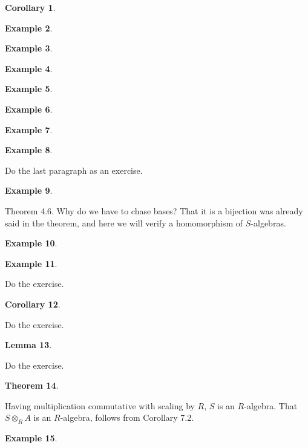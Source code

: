 \documentclass{article}
\newtheorem{theorem}{Theorem}[section]
\newtheorem{corollary}[theorem]{Corollary}
\newtheorem{lemma}[theorem]{Lemma}
\newtheorem{example}[theorem]{Example}
\begin{document}
\begin{corollary}
\end{corollary}

\begin{example}
\end{example}

\begin{example}
\end{example}

\begin{example}
\end{example}

\begin{example}
\end{example}

\begin{example}
\end{example}

\begin{example}
\end{example}

\begin{example}
\end{example}
Do the last paragraph as an exercise.

\begin{example}
\end{example}
Theorem 4.6. Why do we have to chase bases? That it is a bijection was already said in the theorem, and here we will verify a homomorphism of $S$-algebras.

\begin{example}
\end{example}

\begin{example}
\end{example}
Do the exercise.

\begin{corollary}
\end{corollary}
Do the exercise.

\begin{lemma}
\end{lemma}
Do the exercise.

\begin{theorem}
\end{theorem}
Having multiplication commutative with scaling by $R$, $S$ is an $R$-algebra. That $S \otimes_R A$ is an $R$-algebra, follows from Corollary 7.2.

\begin{example}
\end{example}
\end{document}
